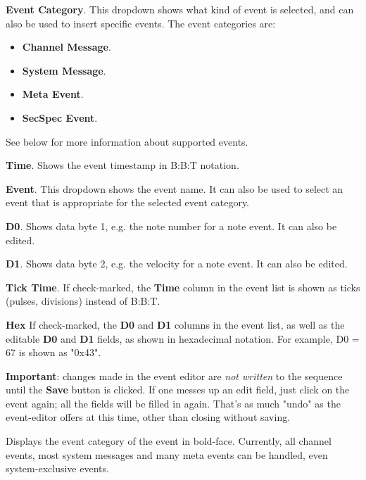    \begin{enumber}
      \item \textbf{Event Category}.
         This dropdown shows what kind of event is selected, and can
         also be used to insert specific events. The event categories are:
         \begin{itemize}
            \item \textbf{Channel Message}.
            \item \textbf{System Message}.
            \item \textbf{Meta Event}.
            \item \textbf{SecSpec Event}.
         \end{itemize}
         See below for more information about supported events.
      \item \textbf{Time}.
         Shows the event timestamp in B:B:T notation.
      \item \textbf{Event}.
         This dropdown shows the event name.
         It can also be used to select an event that is appropriate for
         the selected event category.
      \item \textbf{D0}.
         Shows data byte 1, e.g. the note number for a note event.
         It can also be edited.
      \item \textbf{D1}.
         Shows data byte 2, e.g. the velocity for a note event.
         It can also be edited.
      \item \textbf{Tick Time}.
         If check-marked, the \textbf{Time} column in the event list
         is shown as ticks (pulses, divisions) instead of B:B:T.
      \item \textbf{Hex}
         If check-marked, the \textbf{D0} and \textbf{D1} columns
         in the event list, as well as the editable
         \textbf{D0} and \textbf{D1} fields, as shown in hexadecimal notation.
         For example, D0 = 67 is shown as "0x43".
   \end{enumber}

   \textbf{Important}: changes made in the event editor
   are \textsl{not written} to the sequence until the \textbf{Save}
   button is clicked.  If one messes up an edit field, just click on the event
   again; all the fields will be filled in again.
   That's as much "undo" as the event-editor offers at this time, other than
   closing without saving.

   \setcounter{ItemCounter}{0}      %

   Displays the event category of the event in bold-face.
   Currently, all channel events, most system messages
   and many meta events can be handled,
   even system-exclusive events.

